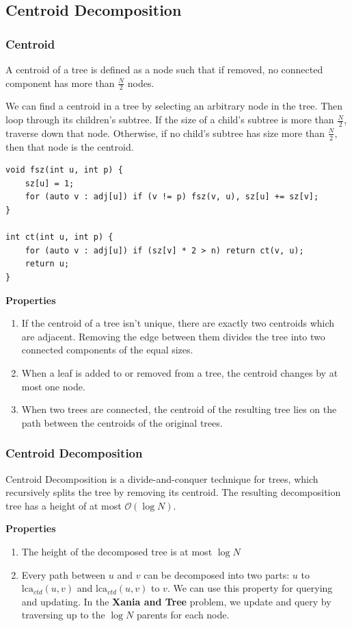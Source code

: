 \subsection{Centroid Decomposition}
\subsubsection{Centroid}
A centroid of a tree is defined as a node such that if removed, no connected component has  more than $\frac{N}{2}$ nodes.

We can find a centroid in a tree by selecting an arbitrary node in the tree. Then loop through its children's subtree. If the size of a child's subtree is more than $\frac{N}{2}$, traverse down that node. Otherwise, if no child's subtree has size more than $\frac{N}{2}$, then that node is the centroid.

\begin{lstlisting}
void fsz(int u, int p) {
    sz[u] = 1;
    for (auto v : adj[u]) if (v != p) fsz(v, u), sz[u] += sz[v];
}

int ct(int u, int p) {
    for (auto v : adj[u]) if (sz[v] * 2 > n) return ct(v, u);
    return u;
}
\end{lstlisting}

\noindent\textbf{Properties}
\begin{enumerate}
    \item If the centroid of a tree isn't unique, there are exactly two centroids which are adjacent. Removing the edge between them divides the tree into two connected components of the equal sizes.
    \item When a leaf is added to or removed from a tree, the centroid changes by at most one node.
    \item When two trees are connected, the centroid of the resulting tree lies on the path between the centroids of the original trees.
\end{enumerate}

\subsubsection{Centroid Decomposition}

Centroid Decomposition is a divide-and-conquer technique for trees, which recursively splits the tree by removing its centroid. The resulting decomposition tree has a height of at most $\mathcal{O}(\log N)$.

\noindent\textbf{Properties}
\begin{enumerate}
    \item The height of the decomposed tree is at most $\log{N}$
    \item Every path between $u$ and $v$ can be decomposed into two parts: $u$ to $\text{lca}_{ctd}(u, v)$ and $\text{lca}_{ctd}(u, v)$ to $v$. We can use this property for querying and updating. In the \textbf{Xania and Tree} problem, we update and query by traversing up to the $\log{N}$ parents for each node.
\end{enumerate}


